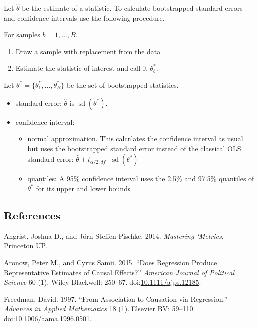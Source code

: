 \documentclass[]{article}
\providecommand{\tightlist}{%
  \setlength{\itemsep}{0pt}\setlength{\parskip}{0pt}}
\DeclareMathOperator{\sd}{sd}
\begin{document}
Let \(\hat\theta\) be the estimate of a statistic. To calculate
bootstrapped standard errors and confidence intervals use the following
procedure.

For samples \(b = 1, ..., B\).

\begin{enumerate}
\def\labelenumi{\arabic{enumi}.}
\tightlist
\item
  Draw a sample with replacement from the data
\item
  Estimate the statistic of interest and call it \(\theta_b^*\).
\end{enumerate}

Let \(\theta^* = \{\theta_1^*, \dots, \theta_B^*\}\) be the set of
bootstrapped statistics.

\begin{itemize}
\item
  standard error: \(\hat\theta\) is \(\sd(\theta^*)\).
\item
  confidence interval:

  \begin{itemize}
  \tightlist
  \item
    normal approximation. This calculates the confidence interval as
    usual but uses the bootstrapped standard error instead of the
    classical OLS standard error:
    \(\hat\theta \pm t_{\alpha/2,df} \cdot \sd(\theta^*)\)
  \item
    quantiles: A 95\% confidence interval uses the 2.5\% and 97.5\%
    quantiles of \(\theta^*\) for its upper and lower bounds.
  \end{itemize}
\end{itemize}

\subsection*{References}\label{references}

\hypertarget{refs}{}
\hypertarget{ref-AngristPischke2014a}{}
Angrist, Joshua D., and Jörn-Steffen Pischke. 2014. \emph{Mastering
`Metrics}. Princeton UP.

\hypertarget{ref-AronowSamii2015a}{}
Aronow, Peter M., and Cyrus Samii. 2015. ``Does Regression Produce
Representative Estimates of Causal Effects?'' \emph{American Journal of
Political Science} 60 (1). Wiley-Blackwell: 250--67.
doi:\href{https://doi.org/10.1111/ajps.12185}{10.1111/ajps.12185}.

\hypertarget{ref-Freedman_1997}{}
Freedman, David. 1997. ``From Association to Causation via Regression.''
\emph{Advances in Applied Mathematics} 18 (1). Elsevier BV: 59--110.
doi:\href{https://doi.org/10.1006/aama.1996.0501}{10.1006/aama.1996.0501}.
\end{document}
